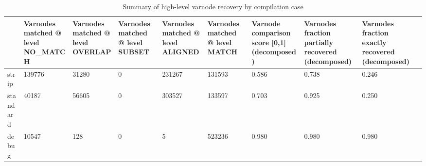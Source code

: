 \begin{table*}[t]
\centering
\caption{Summary of high-level varnode recovery by compilation case}
\label{table*:opts-varnodes-summary}
\begin{tabular}{lp{1.3cm}p{1.3cm}p{1.3cm}p{1.3cm}p{1.3cm}p{1.3cm}p{1.3cm}p{1.3cm}p{1.3cm}}
\toprule
{} &  Varnodes matched @ level NO\_MATCH &  Varnodes matched @ level OVERLAP &  Varnodes matched @ level SUBSET &  Varnodes matched @ level ALIGNED &  Varnodes matched @ level MATCH &  Varnode comparison score [0,1] (decomposed) &  Varnodes fraction partially recovered (decomposed) &  Varnodes fraction exactly recovered (decomposed) \\
\midrule
strip    &                             139776 &                             31280 &                                0 &                            231267 &                          131593 &                                        0.586 &                                              0.738 &                                             0.246 \\
standard &                              40187 &                             56605 &                                0 &                            303527 &                          133597 &                                        0.703 &                                              0.925 &                                             0.250 \\
debug    &                              10547 &                               128 &                                0 &                                 5 &                          523236 &                                        0.980 &                                              0.980 &                                             0.980 \\
\bottomrule
\end{tabular}
\end{table*}
